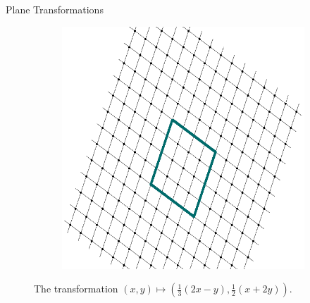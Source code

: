 \documentclass[final]{beamer}
\newlength{\colwidth}
\begin{document}
\begin{frame}[t]
\begin{columns}[t]
\begin{column}{\colwidth}
\begin{block}{Plane Transformations}
\begin{figure}[H]
\begin{subfigure}[c]{.2\textwidth}
    \includegraphics[width=\textwidth]{transformed_grid_2.png}
   \end{subfigure}
   \caption*{The transformation \alert{$(x,y) \mapsto (\frac{1}{3}(2x - y),
   \frac{1}{2}(x + 2y))$}.}
  \end{figure}


\end{block}
\end{column}
\end{columns}
\end{frame}
\end{document}
